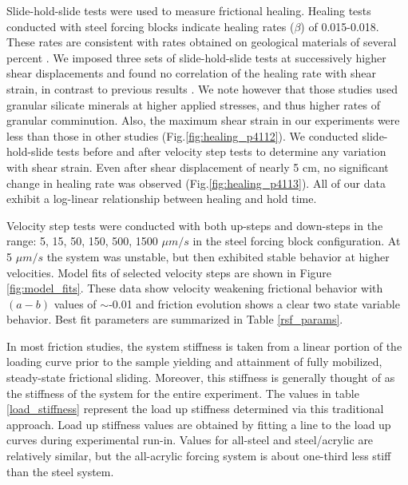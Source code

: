 Slide-hold-slide tests were used to measure frictional healing. Healing tests
conducted with steel forcing blocks indicate healing rates ($\beta$) of
0.015-0.018.  These rates are consistent with rates obtained on geological
materials of several percent
\cite{dieterich1978time,dieterich1972time,Marone_1998,karner1997laboratory,beeler1994roles}.
We imposed three sets of slide-hold-slide tests at successively higher shear
displacements and found no correlation of the healing rate with shear strain, in
contrast to previous results \cite{Richardson_1999}.  We note however that those
studies used granular silicate minerals at higher applied stresses, and thus
higher rates of granular comminution.  Also, the maximum shear strain in our
experiments were less than those in other studies (Fig.\ref{fig:healing_p4112}).
We conducted slide-hold-slide tests before and after velocity step tests to
determine any variation with shear strain. Even after shear displacement of
nearly 5 cm, no significant change in healing rate was observed
(Fig.\ref{fig:healing_p4113}). All of our data exhibit a log-linear relationship
between healing and hold time.

Velocity step tests were conducted with both up-steps and down-steps in the
range: 5, 15, 50, 150, 500, 1500 $\mu m/s$ in the steel forcing block
configuration.  At 5  $\mu m/s$ the system was unstable, but then exhibited
stable behavior at higher velocities.  Model fits of selected velocity steps are
shown in Figure \ref{fig:model_fits}.  These data show velocity weakening
frictional behavior with $(a-b)$ values of $\sim$-0.01 and friction evolution
shows a clear two state variable behavior.  Best fit parameters are summarized
in Table \ref{rsf_params}.

In most friction studies, the system stiffness is taken from a linear portion of
the loading curve prior to the sample yielding and attainment of fully
mobilized, steady-state frictional sliding.  Moreover, this stiffness is
generally thought of as the stiffness of the system for the entire experiment.
The values in table \ref{load_stiffness} represent the load up stiffness
determined via this traditional approach.  Load up stiffness values are obtained
by fitting a line to the load up curves during experimental run-in.  Values for
all-steel and steel/acrylic are relatively similar, but the all-acrylic forcing
system is about one-third less stiff than the steel system.

